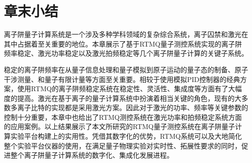 \section[章末小结]{章末小结}

离子阱量子计算系统是一个涉及多种学科领域的复杂综合系统，离子囚禁和激光在其中占据着至关重要的地位。本章展示了基于RTMQ量子测控系统实现的离子阱频率稳定、激光功率稳定以及激光拍频稳定等几个离子阱量子计算的关键子系统。

稳定的离子阱频率在从量子信息处理和量子模拟到原子运动的量子态的制备、原子干涉测量、和量子有限计量等方面至关重要。相较于使用模拟PID控制器的经典方案，使用RTMQ的离子阱频稳定系统在稳定性、灵活性、集成度等方面有了大幅度的提高。激光在基于离子的量子计算系统中扮演着相当关键的角色，现有的大多数多离子比特的实现都是采用激光方案。因此对于激光的功率、频率等关键参数的控制十分重要，本章中也给出了RTMQ测控系统在激光功率和拍频稳定系统方面的应用案例。以上结果展示了本文所研究的RTMQ量子测控系统在离子阱量子计算实验平台构建上的实用性。凭借其数字化的优势，RTMQ系统可以及大地简化整个实验平台仪器的使用，在满足量子物理实验对实时性、拓展性要求的同时，促进整个离子阱量子计算系统的数字化、集成化发展进程。





